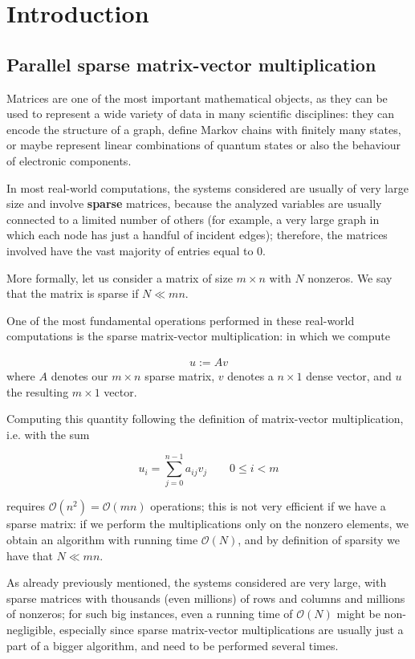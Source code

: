 \chapter{Introduction}
\section{Parallel sparse matrix-vector multiplication}
Matrices are one of the most important mathematical objects, as they can be used to represent a wide variety of data in many scientific disciplines: they can encode the structure of a graph, define Markov chains with finitely many states, or maybe represent linear combinations of quantum states or also the behaviour of electronic components. 

In most real-world computations, the systems considered are usually of very large size and involve \textbf{sparse} matrices, because the analyzed variables are usually connected to a limited number of others (for example, a very large graph in which each node has just a handful of incident edges); therefore, the matrices involved have the vast majority of entries equal to 0.

More formally, let us consider a matrix of size $m \times n$ with $N$ nonzeros. We say that the matrix is sparse if $ N \ll mn $.

One of the most fundamental operations performed in these real-world computations is the sparse matrix-vector multiplication: in which we compute

\begin{align}
	u:=Av
	\label{uAv}
\end{align}
where $A$ denotes our $m \times n$ sparse matrix, $v$ denotes a $n \times 1$ dense vector, and $u$ the resulting $m \times 1$ vector.

Computing this quantity following the definition of matrix-vector multiplication, i.e. with the sum 

\[ 
	u_i = \sum_{j=0}^{n-1} a_{ij} v_j \qquad 0 \leq i < m 
\]

requires $\mathcal{O}(n^2) = \mathcal{O}(mn)$ operations; this is not very efficient if we have a sparse matrix: if we perform the multiplications only on the nonzero elements, we obtain an algorithm with running time $\mathcal{O}(N)$, and by definition of sparsity we have that $N \ll mn$.

As already previously mentioned, the systems considered are very large, with sparse matrices with thousands (even millions) of rows and columns and millions of nonzeros; for such big instances, even a running time of $\mathcal{O}(N)$ might be non-negligible, especially since sparse matrix-vector multiplications are usually just a part of a bigger algorithm, and need to be performed several times.

